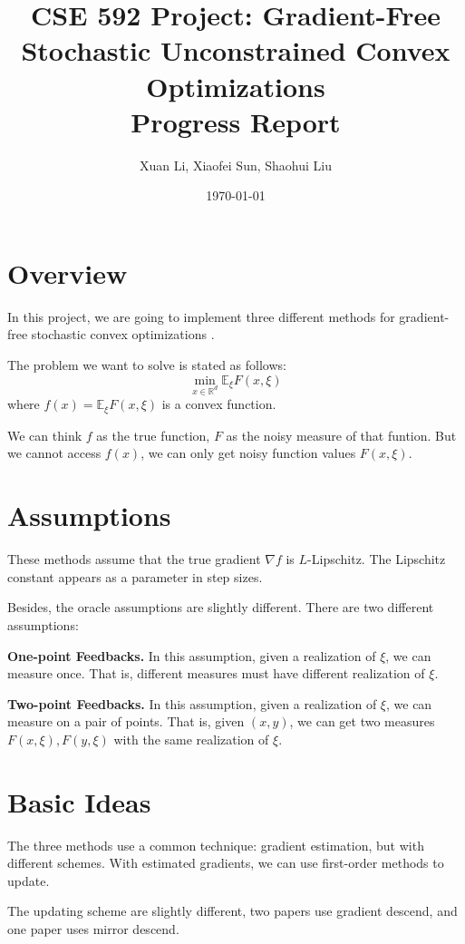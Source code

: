 \documentclass[a4paper,twocolumn]{article}
\title{CSE 592 Project: Gradient-Free Stochastic Unconstrained Convex Optimizations\\
Progress Report}
\author{Xuan Li, Xiaofei Sun, Shaohui Liu}
\date{\today}
\begin{document}
\maketitle

\section{Overview}
In this project, we are going to implement three different methods for gradient-free  stochastic convex optimizations
\cite{Chen2015RandomizedDO}\cite{Dv2018Accelerated}\cite{Ghadimi2013StochasticFA}.

The problem we want to solve is stated as follows:
\begin{equation}
\min_{x\in \mathbb{R}^d} \mathbb{E}_\xi F(x,\xi)
\end{equation}
where $f(x) = \mathbb{E}_\xi F(x,\xi)$ is a convex function.

We can think $f$ as the true function, $F$ as the noisy measure of that funtion. But we cannot access $f(x)$, we can only get noisy function values $F(x,\xi)$. 

\section{Assumptions}
These methods assume that the true gradient $\nabla {f}$ is $L$-Lipschitz. The Lipschitz constant appears as a parameter in step sizes. 

Besides, the oracle assumptions are slightly different. There are two different assumptions:

\textbf{One-point Feedbacks.} In this assumption, given a realization of $\xi$, we can measure once. That is, different measures must have different realization of $\xi$.

\textbf{Two-point Feedbacks.} In this assumption, given a realization of $\xi$, we can measure on a pair of points. That is, given $(x, y)$, we can get two measures $F(x, \xi),F(y, \xi)$ with the same realization of $\xi$.

 
\section{Basic Ideas}
The three methods use a common technique: gradient estimation, but with different schemes. With estimated gradients, we can use first-order methods to update.

The updating scheme are slightly different, two papers use gradient descend, and one paper uses mirror descend. 
\end{document}
